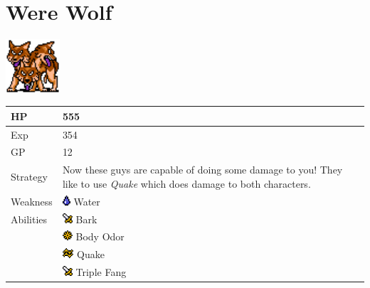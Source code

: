 \section{Were Wolf}
\label{monster:were_wolf}

\includegraphics[height=2cm,keepaspectratio]{./resources/monster/were_wolf}

\begin{longtable}{ l p{9cm} }
	HP
	& 555
\\ \hline
	Exp
	& 354
\\ \hline
	GP
	& 12
\\ \hline
	Strategy
	& Now these guys are capable of doing some damage to you! They like to use \textit{Quake} which does damage to both characters.
\\ \hline
	Weakness
	& \includegraphics[height=1em,keepaspectratio]{./resources/effects/water} Water
\\ \hline
	Abilities
	& \includegraphics[height=1em,keepaspectratio]{./resources/effects/damage} Bark \\
	& \includegraphics[height=1em,keepaspectratio]{./resources/effects/paralyze} Body Odor \\
	& \includegraphics[height=1em,keepaspectratio]{./resources/effects/earth} Quake \\
	& \includegraphics[height=1em,keepaspectratio]{./resources/effects/damage} Triple Fang
\end{longtable}
